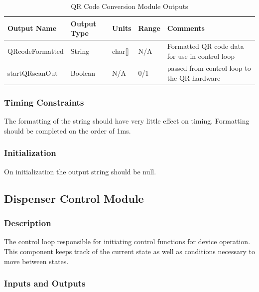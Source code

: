 \documentclass[12pt,titlepage]{article}
\begin{document}
\begin{table}[ht!]
\begin{center}
\begin{adjustbox}{max width=\textwidth}
\small
\begin{tabular}{|p{}|p{}|p{}|p{}|p{}|}
 \hline
 \textbf{Output Name} & \textbf{Output Type} & \textbf{Units} &\textbf{Range} & \textbf{Comments} \\
 \hline 
 QRcodeFormatted & String & char[] & N/A & Formatted QR code data for use in control loop \\
 \hline
 startQRscanOut & Boolean & N/A & 0/1 & passed from control loop to the QR hardware \\
 \hline
\end{tabular}
\end{adjustbox}
\end{center}
\caption{QR Code Conversion Module Outputs}
\end{table}

\subsubsection*{Timing Constraints}
The formatting of the string should have very little effect on timing. Formatting should be completed on the order of 1ms. 
\subsubsection*{Initialization}
On initialization the output string should be null. 

\subsection{Dispenser Control Module}
\subsubsection*{Description}
The control loop responsible for initiating control functions for device operation. This component keeps track of the current state as well as conditions necessary to move between states.

\subsubsection*{Inputs and Outputs}
\end{document}
